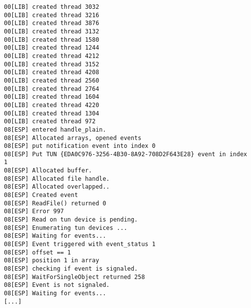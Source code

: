 \begin{lstlisting}[caption=Debug-Log; Zeigt Problematik mit WaitForSingleObject(),label=lst:debug-log]
00[LIB] created thread 3032
00[LIB] created thread 3216
00[LIB] created thread 3876
00[LIB] created thread 3132
00[LIB] created thread 1580
00[LIB] created thread 1244
00[LIB] created thread 4212
00[LIB] created thread 3152
00[LIB] created thread 4208
00[LIB] created thread 2560
00[LIB] created thread 2764
00[LIB] created thread 1604
00[LIB] created thread 4220
00[LIB] created thread 1304
00[LIB] created thread 972
08[ESP] entered handle_plain.
08[ESP] Allocated arrays, opened events
08[ESP] put notification event into index 0
08[ESP] Put TUN {EDA0C976-3256-4B30-8A92-708D2F643E28} event in index 1
08[ESP] Allocated buffer.
08[ESP] Allocated file handle.
08[ESP] Allocated overlapped..
08[ESP] Created event
08[ESP] ReadFile() returned 0
08[ESP] Error 997
08[ESP] Read on tun device is pending.
08[ESP] Enumerating tun devices ...
08[ESP] Waiting for events...
08[ESP] Event triggered with event_status 1
08[ESP] offset == 1
08[ESP] position 1 in array
08[ESP] checking if event is signaled.
08[ESP] WaitForSingleObject returned 258
08[ESP] Event is not signaled.
08[ESP] Waiting for events...
[...]
\end{lstlisting}

